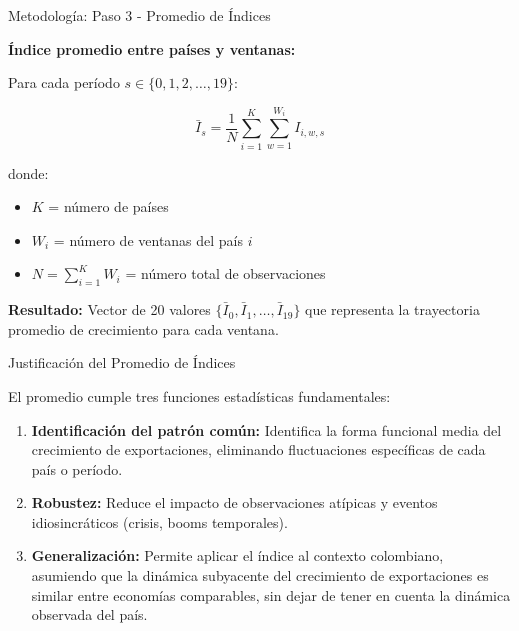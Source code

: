 \documentclass[aspectratio=169,xcolor=dvipsnames]{beamer}
\begin{document}
\begin{frame}{Metodología: Paso 3 - Promedio de Índices}

\textbf{Índice promedio entre países y ventanas:}

Para cada período $s \in \{0, 1, 2, \ldots, 19\}$:

\[\bar{I}_s = \frac{1}{N} \sum_{i=1}^{K} \sum_{w=1}^{W_i} I_{i,w,s}\]

donde:
\begin{itemize}
    \item $K$ = número de países
    \item $W_i$ = número de ventanas del país $i$
    \item $N = \sum_{i=1}^{K} W_i$ = número total de observaciones
\end{itemize}

\vspace{0.3cm}

\textbf{Resultado:} Vector de 20 valores $\{\bar{I}_0, \bar{I}_1, \ldots, \bar{I}_{19}\}$ que representa la trayectoria promedio de crecimiento para cada ventana.

\end{frame}

\begin{frame}{Justificación del Promedio de Índices}

El promedio cumple tres funciones estadísticas fundamentales:

\vspace{0.3cm}

\begin{enumerate}
    \item \textbf{Identificación del patrón común:} Identifica la forma funcional media del crecimiento de exportaciones, eliminando fluctuaciones específicas de cada país o período.
    
    \vspace{0.2cm}
    
    \item \textbf{Robustez:} Reduce el impacto de observaciones atípicas y eventos idiosincráticos (crisis, booms temporales).
    
    \vspace{0.2cm}
    
    \item \textbf{Generalización:} Permite aplicar el índice al contexto colombiano, asumiendo que la dinámica subyacente del crecimiento de exportaciones es similar entre economías comparables, sin dejar de tener en cuenta la dinámica observada del país.
\end{enumerate}

\end{frame}
\end{document}
